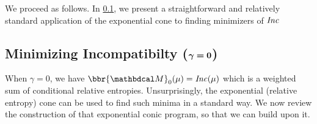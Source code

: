 \documentclass[twoside]{article}
\begin{document}
% 



We proceed as follows.
In \cref{sec:minimize-inc}, we present a straightforward
and relatively standard application of the exponential cone to finding minimizers of $\mathit{Inc}$

\subsection{%
    Minimizing Incompatibilty 
    (\texorpdfstring{$\boldsymbol\gamma\boldsymbol=\mathbf{0}$}{gamma=0})%
} \label{sec:minimize-inc}

When $\gamma = 0$, we have $\bbr{\dg M}_0(\mu)= \Inc(\mu)$ which is a weighted sum of conditional relative entropies.
Unsurprisingly, the exponential (relative entropy) cone can be used to find such minima in a standard way.
We now review the construction of that exponential conic program, 
    so that we can build upon it.
\end{document}
